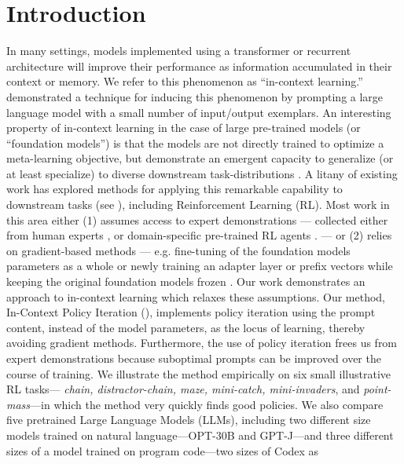 \documentclass{article}
\begin{document}
\section{Introduction}
In many settings, models implemented using a transformer or recurrent
architecture will improve their performance as information accumulated in their
context or memory. We refer to this phenomenon as ``in-context learning.''
\parencite{brown2020language} demonstrated a technique for inducing this phenomenon
by prompting a large language model with a small number of input/output
exemplars. An interesting property of in-context learning in the case of large
pre-trained models (or ``foundation models'') is that the models are not
directly trained to optimize a meta-learning objective, but demonstrate an
emergent capacity to generalize (or at least specialize) to diverse downstream
task-distributions \parencite{wei_emergent_2022}.
A litany of existing work has explored methods for applying this remarkable
capability to downstream tasks (see ), including
Reinforcement Learning (RL). Most work in this area either (1) assumes access to
expert demonstrations --- collected either from human experts
\parencite{huang_language_2022,baker_video_2022}, or domain-specific pre-trained RL
agents
\parencite{chen_decision_2021,lee_multi-game_2022,janner_offline_2021,reed_generalist_2022,xu_prompting_2022}.
--- or (2) relies on gradient-based methods --- e.g. fine-tuning of the
foundation models parameters as a whole
\parencite{lee_multi-game_2022,reed_generalist_2022,baker_video_2022} or newly
training an adapter layer or prefix vectors while keeping the original
foundation models frozen
\parencite{li_prefix-tuning_2021,singh_know_2022,karimi_mahabadi_prompt-free_2022}.
Our work demonstrates an approach to in-context learning which relaxes these
assumptions. Our method, In-Context Policy Iteration (\Algorithm{}), implements
policy iteration using the prompt content, instead of the model parameters, as
the locus of learning, thereby avoiding gradient methods. Furthermore, the use
of policy iteration frees us from expert demonstrations because suboptimal
prompts can be improved over the course of training.
We illustrate the method empirically on six small illustrative RL tasks---
\emph{chain, distractor-chain, maze, mini-catch, mini-invaders}, and
\emph{point-mass}---in which the method very quickly finds good policies.  We
also compare five pretrained Large Language Models (LLMs), including two
different size models trained on natural language---OPT-30B and GPT-J---and
three different sizes of a model trained on program code---two sizes of Codex as
\end{document}
